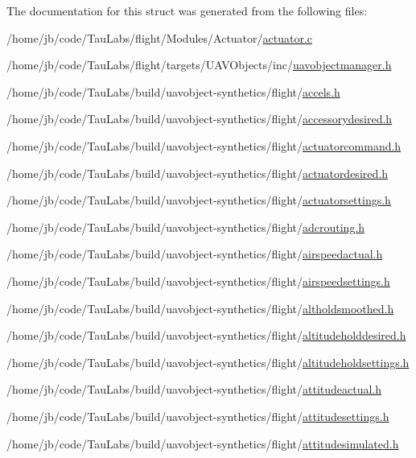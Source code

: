 \-The documentation for this struct was generated from the following files\-:\begin{DoxyCompactItemize}
\item 
/home/jb/code/\-Tau\-Labs/flight/\-Modules/\-Actuator/\hyperlink{actuator_8c}{actuator.\-c}\item 
/home/jb/code/\-Tau\-Labs/flight/targets/\-U\-A\-V\-Objects/inc/\hyperlink{targets_2_u_a_v_objects_2inc_2uavobjectmanager_8h}{uavobjectmanager.\-h}\item 
/home/jb/code/\-Tau\-Labs/build/uavobject-\/synthetics/flight/\hyperlink{accels_8h}{accels.\-h}\item 
/home/jb/code/\-Tau\-Labs/build/uavobject-\/synthetics/flight/\hyperlink{accessorydesired_8h}{accessorydesired.\-h}\item 
/home/jb/code/\-Tau\-Labs/build/uavobject-\/synthetics/flight/\hyperlink{actuatorcommand_8h}{actuatorcommand.\-h}\item 
/home/jb/code/\-Tau\-Labs/build/uavobject-\/synthetics/flight/\hyperlink{actuatordesired_8h}{actuatordesired.\-h}\item 
/home/jb/code/\-Tau\-Labs/build/uavobject-\/synthetics/flight/\hyperlink{actuatorsettings_8h}{actuatorsettings.\-h}\item 
/home/jb/code/\-Tau\-Labs/build/uavobject-\/synthetics/flight/\hyperlink{adcrouting_8h}{adcrouting.\-h}\item 
/home/jb/code/\-Tau\-Labs/build/uavobject-\/synthetics/flight/\hyperlink{airspeedactual_8h}{airspeedactual.\-h}\item 
/home/jb/code/\-Tau\-Labs/build/uavobject-\/synthetics/flight/\hyperlink{airspeedsettings_8h}{airspeedsettings.\-h}\item 
/home/jb/code/\-Tau\-Labs/build/uavobject-\/synthetics/flight/\hyperlink{altholdsmoothed_8h}{altholdsmoothed.\-h}\item 
/home/jb/code/\-Tau\-Labs/build/uavobject-\/synthetics/flight/\hyperlink{altitudeholddesired_8h}{altitudeholddesired.\-h}\item 
/home/jb/code/\-Tau\-Labs/build/uavobject-\/synthetics/flight/\hyperlink{altitudeholdsettings_8h}{altitudeholdsettings.\-h}\item 
/home/jb/code/\-Tau\-Labs/build/uavobject-\/synthetics/flight/\hyperlink{attitudeactual_8h}{attitudeactual.\-h}\item 
/home/jb/code/\-Tau\-Labs/build/uavobject-\/synthetics/flight/\hyperlink{attitudesettings_8h}{attitudesettings.\-h}\item 
/home/jb/code/\-Tau\-Labs/build/uavobject-\/synthetics/flight/\hyperlink{attitudesimulated_8h}{attitudesimulated.\-h}\item 

\end{DoxyCompactItemize}
